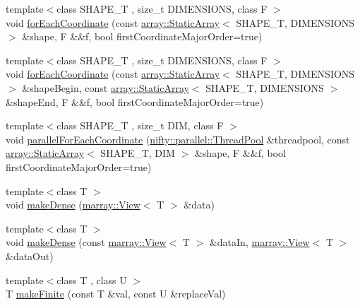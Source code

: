 \begin{DoxyCompactItemize}
\item 
{\footnotesize template$<$class S\+H\+A\+P\+E\+\_\+\+T , size\+\_\+t D\+I\+M\+E\+N\+S\+I\+O\+N\+S, class F $>$ }\\void \hyperlink{namespacenifty_1_1tools_a81df2669bba7acc0ad9a253669a28ba4}{for\+Each\+Coordinate} (const \hyperlink{namespacenifty_1_1array_a683f151f19c851754e0c6d55ed16a0c2}{array\+::\+Static\+Array}$<$ S\+H\+A\+P\+E\+\_\+\+T, D\+I\+M\+E\+N\+S\+I\+O\+N\+S $>$ \&shape, F \&\&f, bool first\+Coordinate\+Major\+Order=true)
\item 
{\footnotesize template$<$class S\+H\+A\+P\+E\+\_\+\+T , size\+\_\+t D\+I\+M\+E\+N\+S\+I\+O\+N\+S, class F $>$ }\\void \hyperlink{namespacenifty_1_1tools_a757aec65ec994397f40a807952edd219}{for\+Each\+Coordinate} (const \hyperlink{namespacenifty_1_1array_a683f151f19c851754e0c6d55ed16a0c2}{array\+::\+Static\+Array}$<$ S\+H\+A\+P\+E\+\_\+\+T, D\+I\+M\+E\+N\+S\+I\+O\+N\+S $>$ \&shape\+Begin, const \hyperlink{namespacenifty_1_1array_a683f151f19c851754e0c6d55ed16a0c2}{array\+::\+Static\+Array}$<$ S\+H\+A\+P\+E\+\_\+\+T, D\+I\+M\+E\+N\+S\+I\+O\+N\+S $>$ \&shape\+End, F \&\&f, bool first\+Coordinate\+Major\+Order=true)
\item 
{\footnotesize template$<$class S\+H\+A\+P\+E\+\_\+\+T , size\+\_\+t D\+I\+M, class F $>$ }\\void \hyperlink{namespacenifty_1_1tools_a34595523082dffa3f21d4b40cc13cfae}{parallel\+For\+Each\+Coordinate} (\hyperlink{classnifty_1_1parallel_1_1ThreadPool}{nifty\+::parallel\+::\+Thread\+Pool} \&threadpool, const \hyperlink{namespacenifty_1_1array_a683f151f19c851754e0c6d55ed16a0c2}{array\+::\+Static\+Array}$<$ S\+H\+A\+P\+E\+\_\+\+T, D\+I\+M $>$ \&shape, F \&\&f, bool first\+Coordinate\+Major\+Order=true)
\item 
{\footnotesize template$<$class T $>$ }\\void \hyperlink{namespacenifty_1_1tools_a2c8c36d25cd0360146bec83f981de045}{make\+Dense} (\hyperlink{classandres_1_1View}{marray\+::\+View}$<$ T $>$ \&data)
\item 
{\footnotesize template$<$class T $>$ }\\void \hyperlink{namespacenifty_1_1tools_a0fba3a0bb159e35a054e7ea8f258c4c3}{make\+Dense} (const \hyperlink{classandres_1_1View}{marray\+::\+View}$<$ T $>$ \&data\+In, \hyperlink{classandres_1_1View}{marray\+::\+View}$<$ T $>$ \&data\+Out)
\item 
{\footnotesize template$<$class T , class U $>$ }\\T \hyperlink{namespacenifty_1_1tools_abefcf35b4e6658bb8179a41a2de97d9e}{make\+Finite} (const T \&val, const U \&replace\+Val)
\end{DoxyCompactItemize}


